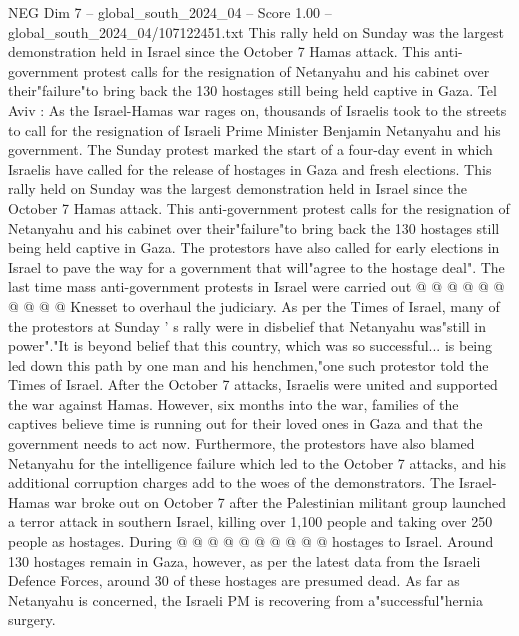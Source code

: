 \begin{textsample}{NEG Dim 7 – global\_south\_2024\_04 – Score 1.00 – global\_south\_2024\_04/107122451.txt}  \label{ex:f7_neg_281}
This rally held on Sunday was the largest demonstration held in Israel since the October 7 Hamas attack.
This anti-government protest calls for the resignation of Netanyahu and his cabinet over their"failure"to bring back the 130 hostages still being held captive in Gaza.
Tel Aviv : As the Israel-Hamas war rages on, thousands of Israelis took to the streets to call for the resignation of Israeli Prime Minister Benjamin Netanyahu and his government.
The Sunday protest marked the start of a four-day event in which Israelis have called for the release of hostages in Gaza and fresh elections.
This rally held on Sunday was the largest demonstration held in Israel since the October 7 Hamas attack.
This anti-government protest calls for the resignation of Netanyahu and his cabinet over their"failure"to bring back the 130 hostages still being held captive in Gaza.
The protestors have also called for early elections in Israel to pave the way for a government that will"agree to the hostage deal".
The last time mass anti-government protests in Israel were carried out @ @ @ @ @ @ @ @ @ @ Knesset to overhaul the judiciary.
As per the Times of Israel, many of the protestors at Sunday ' s rally were in disbelief that Netanyahu was"still in power"."It is beyond belief that this country, which was so successful... is being led down this path by one man and his henchmen,"one such protestor told the Times of Israel.
After the October 7 attacks, Israelis were united and supported the war against Hamas.
However, six months into the war, families of the captives believe time is running out for their loved ones in Gaza and that the government needs to act now.
Furthermore, the protestors have also blamed Netanyahu for the intelligence failure which led to the October 7 attacks, and his additional corruption charges add to the woes of the demonstrators.
The Israel-Hamas war broke out on October 7 after the Palestinian militant group launched a terror attack in southern Israel, killing over 1,100 people and taking over 250 people as hostages.
During @ @ @ @ @ @ @ @ @ @ hostages to Israel.
Around 130 hostages remain in Gaza, however, as per the latest data from the Israeli Defence Forces, around 30 of these hostages are presumed dead.
As far as Netanyahu is concerned, the Israeli PM is recovering from a"successful"hernia surgery.

\end{textsample}
